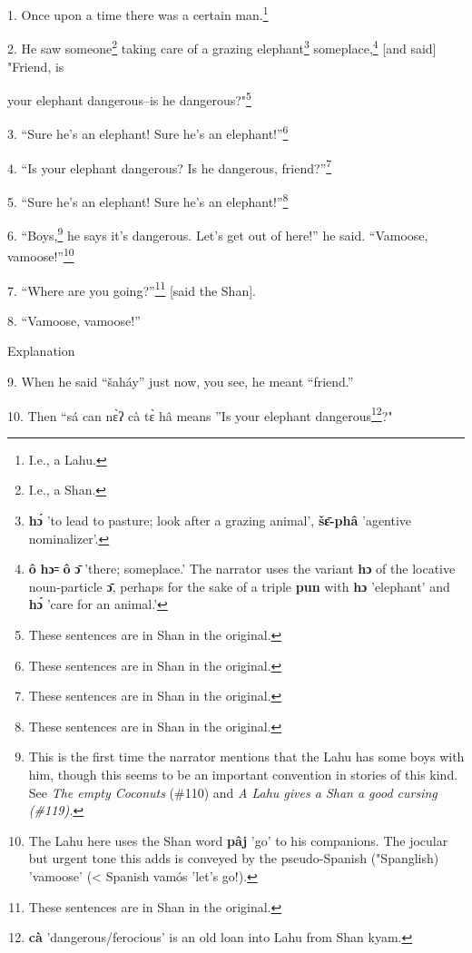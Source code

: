 \setcounter{footnote}{0}


1. Once upon a time there was a certain man.\footnote{I.e., a Lahu.}

2. He saw someone\footnote{I.e., a Shan.} taking care of a grazing elephant\footnote{\textbf{hɔ́} 'to lead to pasture; look after a grazing animal', \textbf{šɛ̄-phâ} 'agentive nominalizer'.} someplace,\footnote{\textbf{ô} \textbf{hɔ꞊} \textbf{ô} \textbf{ɔ̄} 'there; someplace.' The narrator uses the variant \textbf{hɔ} of the locative noun-particle \textbf{ɔ̄}, perhaps for the sake of a triple \textbf{pun} with \textbf{hɔ} 'elephant' and \textbf{hɔ́} 'care for an animal.'} [and
said] "Friend, is

your elephant dangerous--is he dangerous?"\footnote{These sentences are in Shan in the original.}

3. ``Sure he's an elephant! Sure he's an elephant!''\footnote{These sentences are in Shan in the original.}

4. ``Is your elephant dangerous? Is he dangerous, friend?''\footnote{These sentences are in Shan in the original.}

5. ``Sure he's an elephant! Sure he's an elephant!''\footnote{These sentences are in Shan in the original.}

6. ``Boys,\footnote{This is the first time the narrator mentions that the Lahu has some boys with him, though this seems to be an important convention in stories of this kind. See\textit{ The empty Coconuts} (\#110) and \textit{A Lahu gives a Shan a good cursing (\#119).}} he says it's dangerous. Let's get out of here!''
he said. ``Vamoose, vamoose!''\footnote{The Lahu here uses the Shan word \textbf{pâj} 'go' to his companions. The jocular but urgent tone this adds is conveyed by the pseudo-Spanish ("Spanglish) 'vamoose' (< Spanish vamós 'let's go!).}

7. ``Where are you going?''\footnote{These sentences are in Shan in the original.} [said the Shan].

8. ``Vamoose, vamoose!''

\begin{center}
Explanation
\end{center}


9. When he said ``šaháy'' just now, you see, he meant ``friend.''

10. Then ``sá can nɛ̀ʔ cà tɛ̀ hâ means ''Is your elephant
dangerous\footnote{\textbf{cà} 'dangerous/ferocious' is an old loan into Lahu from Shan kyam.}?"

